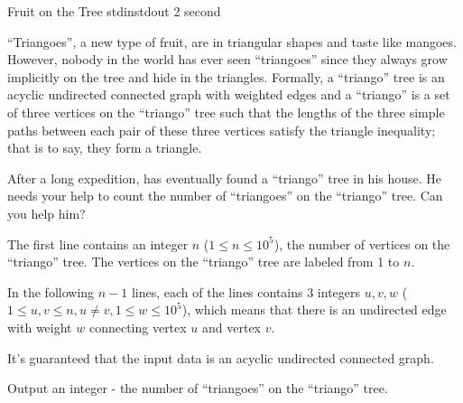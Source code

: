 
\begin{problem}{Fruit on the Tree}
{stdin}{stdout}
{2 second}{}{}

``Triangoes'', a new type of fruit, are in triangular shapes and taste like mangoes. However, nobody in the world has ever seen ``triangoes'' since they always grow implicitly on the tree and hide in the triangles. Formally, a ``triango'' tree is an acyclic undirected connected graph with weighted edges and a ``triango'' is a set of three vertices on the ``triango'' tree such that the lengths of the three simple paths between each pair of these three vertices satisfy the triangle inequality; that is to say, they form a triangle.

After a long expedition, \Suzukaze has eventually found a ``triango'' tree in his house. He needs your help to count the number of ``triangoes'' on the ``triango'' tree. Can you help him?

\InputFile

The first line contains an integer $n$ ($1 \le n \le 10^5$), the number of vertices on the ``triango'' tree. The vertices on the ``triango'' tree are labeled from 1 to $n$.

In the following $n-1$ lines, each of the lines contains 3 integers $u, v, w$ ($1 \le u,v \le n, u \neq v, 1 \le w \le 10^5$), which means that there is an undirected edge with weight $w$ connecting vertex $u$ and vertex $v$.

It's guaranteed that the input data is an acyclic undirected connected graph.

\OutputFile

Output an integer - the number of ``triangoes'' on the ``triango'' tree.

\Examples

\begin{example}
%
\end{example}

\end{problem}
